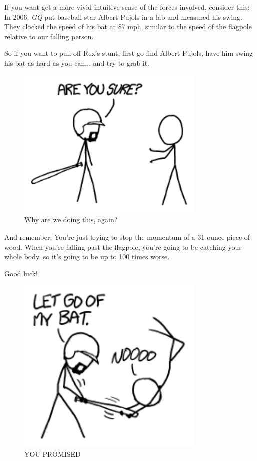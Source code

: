 {{If you want get a more vivid intuitive sense of the forces involved, consider this: In 2006, \emph{GQ} put baseball star Albert Pujols in a lab and measured his swing. They clocked the speed of his bat at 87 mph, similar to the speed of the flagpole relative to our falling person.}

{So if you want to pull off Rex's stunt, first go find Albert Pujols, have him swing his bat as hard as you can... and try to grab it.}

\begin{figure}[!htbp]
\centering
\includegraphics[scale=0.5, max width=0.8\textwidth]{imgs/a/133/bat.png}
\caption{Why are we doing this, again?}
\end{figure}

{And remember: You're just trying to stop the momentum of a 31-ounce piece of wood. When you're falling past the flagpole, you're going to be catching your whole body, so it's going to be up to 100 times worse.}

{Good luck!}

\begin{figure}[!htbp]
\centering
\includegraphics[scale=0.5, max width=0.8\textwidth]{imgs/a/133/bat2.png}
\caption{YOU PROMISED}
\end{figure}

}

